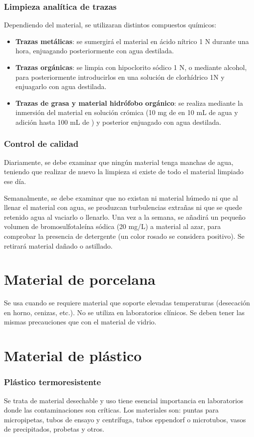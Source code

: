 \subsubsection{Limpieza analítica de trazas}
Dependiendo del material, se utilizaran distintos compuestos químicos:
\begin{itemize}[itemsep=0pt,parsep=0pt,topsep=0pt,partopsep=0pt]
    \item \textbf{Trazas metálicas}: se sumergirá el material en ácido nítrico 1 N durante una hora, enjuagando posteriormente con agua destilada.
    \item\textbf{Trazas orgánicas}: se limpia con hipoclorito sódico 1 N, o mediante alcohol, para posteriormente introducirlos en una solución de clorhídrico 1N y enjuagarlo con agua destilada.
    \item\textbf{Trazas de grasa y material hidrófobo orgánico}: se realiza mediante la inmersión del material en solución crómica (10 mg de  en 10 mL de agua y adición hasta 100 mL de ) y posterior enjuagado con agua destilada.
\end{itemize}
\subsubsection{Control de calidad}
Diariamente, se debe examinar que ningún material tenga manchas de agua, teniendo que realizar de nuevo la limpieza si existe de todo el material limpiado ese día.

Semanalmente, se debe examinar que no existan ni material húmedo ni que al llenar el material con agua, se produzcan turbulencias extrañas ni que se quede retenido agua al vaciarlo o llenarlo. Una vez a la semana, se añadirá un pequeño volumen de bromosulfotaleína sódica (20 mg/L) a material al azar, para comprobar la presencia de detergente (un color rosado se considera positivo). Se retirará material dañado o astillado.
\section{Material de porcelana}
Se usa cuando se requiere material que soporte elevadas temperaturas (desecación en horno, cenizas, etc.). No se utiliza en laboratorios clínicos. Se deben tener las mismas precauciones que con el material de vidrio.
\section{Material de plástico}
\subsubsection{Plástico termoresistente}
Se trata de material desechable y uso tiene esencial importancia en laboratorios donde las contaminaciones son críticas. Los materiales son: puntas para micropipetas, tubos de ensayo y centrífuga, tubos eppendorf o microtubos, vasos de precipitados, probetas y otros.

